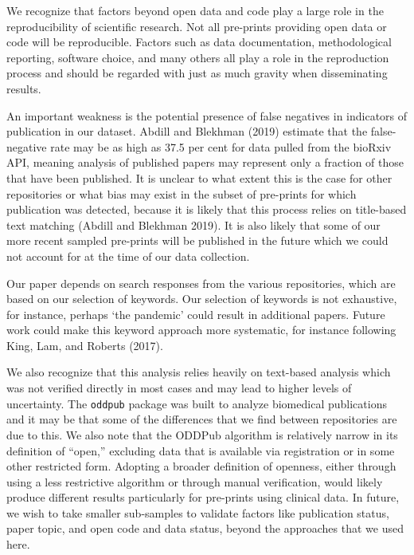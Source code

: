 \documentclass[
]{article}
\begin{document}
We recognize that factors beyond open data and code play a large role in the reproducibility of scientific research. Not all pre-prints providing open data or code will be reproducible. Factors such as data documentation, methodological reporting, software choice, and many others all play a role in the reproduction process and should be regarded with just as much gravity when disseminating results.

An important weakness is the potential presence of false negatives in indicators of publication in our dataset. Abdill and Blekhman (2019) estimate that the false-negative rate may be as high as 37.5 per cent for data pulled from the bioRxiv API, meaning analysis of published papers may represent only a fraction of those that have been published. It is unclear to what extent this is the case for other repositories or what bias may exist in the subset of pre-prints for which publication was detected, because it is likely that this process relies on title-based text matching (Abdill and Blekhman 2019). It is also likely that some of our more recent sampled pre-prints will be published in the future which we could not account for at the time of our data collection.

Our paper depends on search responses from the various repositories, which are based on our selection of keywords. Our selection of keywords is not exhaustive, for instance, perhaps `the pandemic' could result in additional papers. Future work could make this keyword approach more systematic, for instance following King, Lam, and Roberts (2017).

We also recognize that this analysis relies heavily on text-based analysis which was not verified directly in most cases and may lead to higher levels of uncertainty. The \texttt{oddpub} package was built to analyze biomedical publications and it may be that some of the differences that we find between repositories are due to this. We also note that the ODDPub algorithm is relatively narrow in its definition of ``open,'' excluding data that is available via registration or in some other restricted form. Adopting a broader definition of openness, either through using a less restrictive algorithm or through manual verification, would likely produce different results particularly for pre-prints using clinical data. In future, we wish to take smaller sub-samples to validate factors like publication status, paper topic, and open code and data status, beyond the approaches that we used here.

\newpage
\end{document}
